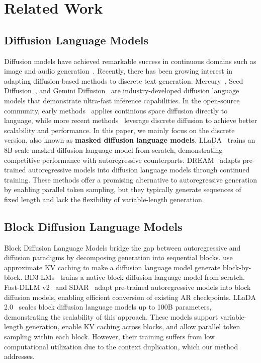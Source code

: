 \section{Related Work}

\subsection{Diffusion Language Models}
Diffusion models have achieved remarkable success in continuous domains such as image and audio generation~\citep{sohl2015deep,ddpm,song2020score,dit}.
Recently, there has been growing interest in adapting diffusion-based methods to discrete text generation. Mercury~\citep{mercury}, Seed Diffusion~\citep{seeddiffusion}, and Gemini Diffusion~\citep{geminidiffusion} are industry-developed diffusion language models that demonstrate ultra-fast inference capabilities.
In the open-source community, early methods~\citep{li2022diffusion,lovelace2023latent,gong2022diffuseq,han2023ssd,strudel2022self,chen2022analog} applies continious space diffusion directly to language,
while more recent methods~\citep{hoogeboom2021argmax,hoogeboomautoregressive,he2023diffusionbert,loudiscrete,ou2024your,sahoo2024simple} leverage discrete diffusion to achieve better scalability and performance.
In this paper, we mainly focus on the discrete version, also known as \textbf{masked diffusion language models}.
LLaDA~\citep{llada} trains an 8B-scale masked diffusion language model from scratch, demonstrating competitive performance with autoregressive counterparts.
DREAM~\citep{dream} adapts pre-trained autoregressive models into diffusion language models through continued training.
These methods offer a promising alternative to autoregressive generation by enabling parallel token sampling, but they typically generate sequences of fixed length and lack the flexibility of variable-length generation.

\subsection{Block Diffusion Language Models}
Block Diffusion Language Models bridge the gap between autoregressive and diffusion paradigms by decomposing generation into sequential blocks.
\citet{ma2025dkv,wu2025fast} use approximate KV caching to make a diffusion language model generate block-by-block.
BD3-LMs~\citep{bd3lms} trains a native block diffusion language model from scratch.
Fast-DLLM v2~\citep{fastdllmv2} and SDAR~\citep{sdar} adapt pre-trained autoregressive models into block diffusion models, enabling efficient conversion of existing AR checkpoints.
LLaDA 2.0~\citep{llada2} scales block diffusion language models up to 100B parameters, demonstrating the scalability of this approach.
These models support variable-length generation, enable KV caching across blocks, and allow parallel token sampling within each block.
However, their training suffers from low computational utilization due to the context duplication, which our method addresses.

